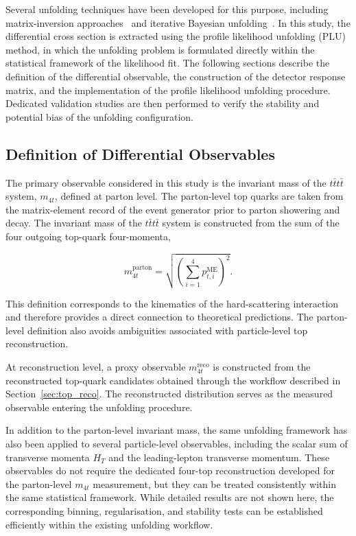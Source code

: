 Several unfolding techniques have been developed for this purpose, including matrix-inversion approaches~\cite{RooUnfoldInvert} and iterative Bayesian unfolding~\cite{DAgostini2010}. 
In this study, the differential cross section is extracted using the profile likelihood unfolding (PLU) method, in which the unfolding problem is formulated directly within the statistical framework of the likelihood fit.
The following sections describe the definition of the differential observable, the construction of the detector response matrix, and the implementation of the profile likelihood unfolding procedure. 
Dedicated validation studies are then performed to verify the stability and potential bias of the unfolding configuration.

\subsection{Definition of Differential Observables}

The primary observable considered in this study is the invariant mass of the $t\bar{t}t\bar{t}$ system, $m_{4t}$, defined at parton level. 
The parton-level top quarks are taken from the matrix-element record of the event generator prior to parton showering and decay. 
The invariant mass of the $t\bar{t}t\bar{t}$ system is constructed from the sum of the four outgoing top-quark four-momenta,

\begin{equation}
m_{4t}^{\text{parton}} =
\sqrt{\left(\sum_{i=1}^{4} p_{t,i}^{\text{ME}}\right)^2}.
\end{equation}

This definition corresponds to the kinematics of the hard-scattering interaction and therefore provides a direct connection to theoretical predictions. 
The parton-level definition also avoids ambiguities associated with particle-level top reconstruction.

At reconstruction level, a proxy observable $m_{4t}^{\text{reco}}$ is constructed from the reconstructed top-quark candidates obtained through the workflow described in Section~\ref{sec:top_reco}. 
The reconstructed distribution serves as the measured observable entering the unfolding procedure.

In addition to the parton-level invariant mass, the same unfolding framework has also been applied to several particle-level observables, including the scalar sum of transverse momenta $H_T$ and the leading-lepton transverse momentum. 
These observables do not require the dedicated four-top reconstruction developed for the parton-level $m_{4t}$ measurement, but they can be treated consistently within the same statistical framework. 
While detailed results are not shown here, the corresponding binning, regularisation, and stability tests can be established efficiently within the existing unfolding workflow.

